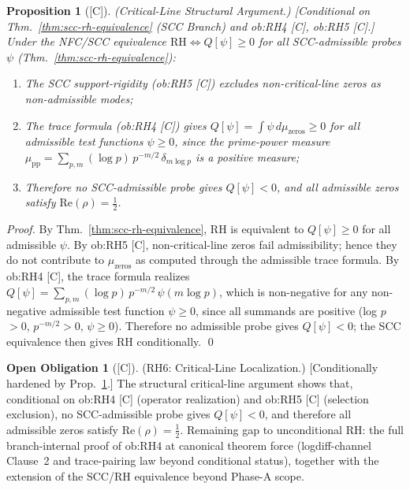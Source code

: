 \documentclass[12pt,oneside]{amsbook}
\theoremstyle{plain}
\newtheorem{proposition}[theorem]{Proposition}
\theoremstyle{definition}
\newtheorem{obligation}[theorem]{Open Obligation}
\theoremstyle{remark}
\newcommand{\status}[1]{\textup{[#1]}}
\begin{document}
\begin{proposition}[\status{C}]\label{prop:rh-critical-line-structural}
\textup{(Critical-Line Structural Argument.)}
\textup{[Conditional on Thm.~\ref{thm:scc-rh-equivalence} (SCC Branch)
and ob:RH4 [C], ob:RH5 [C].]}
Under the NFC/SCC equivalence $\mathrm{RH} \Leftrightarrow
Q[\psi] \geq 0$ for all SCC-admissible probes $\psi$
(Thm.~\ref{thm:scc-rh-equivalence}):
\begin{enumerate}[label=\textup{(\arabic*)}]
 \item The SCC support-rigidity (ob:RH5 [C]) excludes
 non-critical-line zeros as non-admissible modes;
 \item The trace formula (ob:RH4 [C]) gives
 $Q[\psi] = \int \psi\,d\mu_{\mathrm{zeros}} \geq 0$ for
 all admissible test functions $\psi \geq 0$, since the
 prime-power measure $\mu_{\mathrm{pp}} = \sum_{p,m}(\log p)\,
 p^{-m/2}\,\delta_{m\log p}$ is a positive measure;
 \item Therefore no SCC-admissible probe gives $Q[\psi] < 0$,
 and all admissible zeros satisfy $\mathrm{Re}(\rho) =
 \tfrac{1}{2}$.
\end{enumerate}
\end{proposition}

\begin{proof}
By Thm.~\ref{thm:scc-rh-equivalence}, RH is equivalent to
$Q[\psi] \geq 0$ for all admissible $\psi$. By ob:RH5 [C],
non-critical-line zeros fail admissibility; hence they do not
contribute to $\mu_{\mathrm{zeros}}$ as computed through the
admissible trace formula. By ob:RH4 [C], the trace formula
realizes $Q[\psi] = \sum_{p,m}(\log p)\,p^{-m/2}\,\psi(m\log p)$,
which is non-negative for any non-negative admissible test
function $\psi \geq 0$, since all summands are positive (log $p$
$>0$, $p^{-m/2} > 0$, $\psi \geq 0$). Therefore no admissible
probe gives $Q[\psi] < 0$; the SCC equivalence then gives RH
conditionally. \qed
\end{proof}

\begin{obligation}[\status{C}]\label{ob:RH6}
\textup{(RH6: Critical-Line Localization.)}
\textup{[Conditionally hardened by
Prop.~\ref{prop:rh-critical-line-structural}.]}
The structural critical-line argument shows that, conditional on
ob:RH4 [C] (operator realization) and ob:RH5 [C] (selection
exclusion), no SCC-admissible probe gives $Q[\psi] < 0$, and
therefore all admissible zeros satisfy $\mathrm{Re}(\rho) =
\tfrac{1}{2}$. Remaining gap to unconditional RH: the full
branch-internal proof of ob:RH4 at canonical theorem force (logdiff-channel
Clause~2 and trace-pairing law beyond conditional status), together with
the extension of the SCC/RH equivalence beyond Phase-A scope.
\end{obligation}
\end{document}

